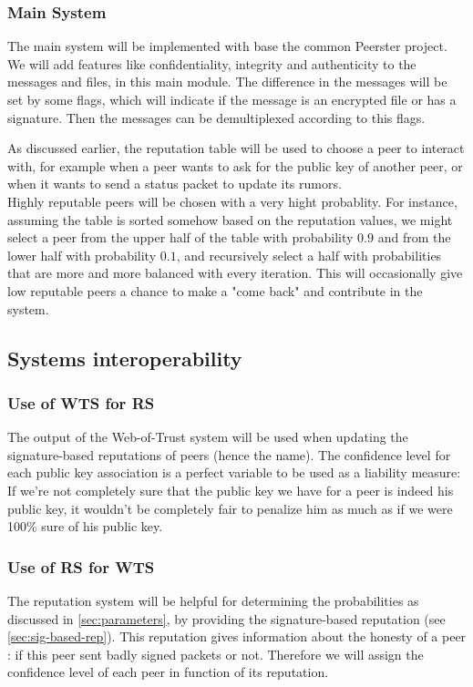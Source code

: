 \documentclass[]{article}
\begin{document}
\subsubsection{Main System}
The main system will be implemented with base the common Peerster project. \\
We will add features like confidentiality, integrity and authenticity to the messages and files, in this main module. The difference in the messages will be set by some flags, which will indicate if the message is an encrypted file or has a signature. Then the messages can be demultiplexed according to this flags.

As discussed earlier, the reputation table will be used to choose a peer to interact with, for example when a peer wants to ask for the public key of another peer, or when it wants to send a status packet to update its rumors.
\\
Highly reputable peers will be chosen with a very hight probablity. For instance, assuming the table is sorted somehow based on the reputation values, we might select a peer from the upper half of the table with probability $0.9$ and from the lower half with probability $0.1$, and recursively select a half with probabilities that are more and more balanced with every iteration.
This will occasionally give low reputable peers a chance to make a "come back" and contribute in the system.

\subsection{Systems interoperability}

\subsubsection{Use of WTS for RS}
The output of the Web-of-Trust system will be used when updating the signature-based reputations of peers (hence the name).
The confidence level for each public key association is a perfect variable to be used as a liability measure:
If we're not completely sure that the public key we have for a peer is indeed his public key, it wouldn't be completely fair to penalize him as much as if we were 100\% sure of his public key.

\subsubsection{Use of RS for WTS}
\label{sec:design-arch-interop-rs-wts}
The reputation system will be helpful for determining the probabilities as discussed in \ref{sec:parameters}, by providing the signature-based reputation (see \ref{sec:sig-based-rep}). This reputation gives information about the honesty of a peer : if this peer sent badly signed packets or not. Therefore we will assign the confidence level of each peer in function of its reputation.
\end{document}
